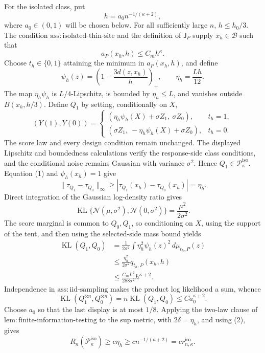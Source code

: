 For the isolated class, put
\[
 h=a_0n^{-1/(\kappa+2)},
\]
where \(a_0\in(0,1)\) will be chosen below.  For all sufficiently large \(n\), \(h\le h_0/3\).  The condition \(\mathrm{ass:isolated\text{-}thin\text{-}site}\) and the definition of \(\mathsf J_P\) supply \(x_h\in\mathcal B\) such that
\[
 a_P(x_h,h)\le C_mh^\kappa.
\]
Choose \(t_h\in\{0,1\}\) attaining the minimum in \(a_P(x_h,h)\), and define
\[
 \psi_h(z)=\left(1-\frac{3d(z,x_h)}h\right)_+,
 \qquad \eta_h=\frac{Lh}{12}.
\]
The map \(\eta_h\psi_h\) is \(L/4\)-Lipschitz, is bounded by \(\eta_h\le L\), and vanishes outside \(B(x_h,h/3)\).  Define \(Q_1\) by setting, conditionally on \(X\),
\[
 (Y(1),Y(0))=
 \begin{cases}
 (\eta_h\psi_h(X)+\sigma Z_1,\ \sigma Z_0),&t_h=1,\\
 (\sigma Z_1,\ -\eta_h\psi_h(X)+\sigma Z_0),&t_h=0.
 \end{cases}
\]
The score law and every design condition remain unchanged.  The displayed Lipschitz and boundedness calculations verify the response-side class conditions, and the conditional noise remains Gaussian with variance \(\sigma^2\).  Hence \(Q_1\in\mathcal P_\kappa^{\mathrm{iso}}\).  Equation (1) and \(\psi_h(x_h)=1\) give
\[
 \|\tau_{Q_1}-\tau_{Q_0}\|_\infty\ge
 |\tau_{Q_1}(x_h)-\tau_{Q_0}(x_h)|=\eta_h. \tag{2}
\]
Direct integration of the Gaussian log-density ratio gives
\[
 \operatorname{KL}\{\mathcal N(\mu,\sigma^2),\mathcal N(0,\sigma^2)\}
 =\frac{\mu^2}{2\sigma^2}.
\]
The score marginal is common to \(Q_0,Q_1\), so conditioning on \(X\), using the support of the tent, and then using the selected-side mass bound yields
\[
 \begin{aligned}
 \operatorname{KL}(Q_1,Q_0)
 &=\frac1{2\sigma^2}\int \eta_h^2\psi_h(z)^2\,d\mu_{t_h,P}(z)\\
 &\le\frac{\eta_h^2}{2\sigma^2}q_{t_h,P}(x_h,h)\\
 &\le\frac{C_mL^2}{288\sigma^2}h^{\kappa+2}. \tag{3}
 \end{aligned}
\]
Independence in \(\mathrm{ass:iid\text{-}sampling}\) makes the product log likelihood a sum, whence
\[
 \operatorname{KL}(Q_1^{\otimes n},Q_0^{\otimes n})
 =n\operatorname{KL}(Q_1,Q_0)
 \le C a_0^{\kappa+2}.
\]
Choose \(a_0\) so that the last display is at most \(1/8\).  Applying the two-law clause of \(\mathrm{lem:finite\text{-}information\text{-}testing}\) to the sup metric, with \(2\delta=\eta_h\), and using (2), gives
\[
 R_n(\mathcal P_\kappa^{\mathrm{iso}})
 \ge c\eta_h
 \ge c n^{-1/(\kappa+2)}
 =c r_{n,\kappa}^{\mathrm{iso}}. \tag{4}
\]

